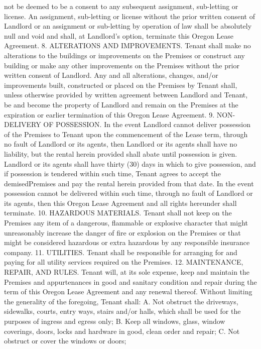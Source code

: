 not be deemed to be a consent to any subsequent assignment, sub-letting or license. An
assignment, sub-letting or license without the prior written consent of Landlord or an assignment
or sub-letting by operation of law shall be absolutely null and void and shall, at Landlord's option,
terminate this Oregon Lease Agreement.
8. ALTERATIONS AND IMPROVEMENTS. Tenant shall make no alterations to the buildings or
improvements on the Premises or construct any building or make any other improvements on the
Premises without the prior written consent of Landlord. Any and all alterations, changes, and/or
improvements built, constructed or placed on the Premises by Tenant shall, unless otherwise
provided by written agreement between Landlord and Tenant, be and become the property of
Landlord and remain on the Premises at the expiration or earlier termination of this Oregon Lease
Agreement.
9. NON-DELIVERY OF POSSESSION. In the event Landlord cannot deliver possession of the
Premises to Tenant upon the commencement of the Lease term, through no fault of Landlord or
its agents, then Landlord or its agents shall have no liability, but the rental herein provided shall
abate until possession is given. Landlord or its agents shall have thirty (30) days in which to give
possession, and if possession is tendered within such time, Tenant agrees to accept the demisedPremises and pay the rental herein provided from that date. In the event possession cannot be
delivered within such time, through no fault of Landlord or its agents, then this Oregon Lease
Agreement and all rights hereunder shall terminate.
10. HAZARDOUS MATERIALS. Tenant shall not keep on the Premises any item of a dangerous,
flammable or explosive character that might unreasonably increase the danger of fire or explosion
on the Premises or that might be considered hazardous or extra hazardous by any responsible
insurance company.
11. UTILITIES. Tenant shall be responsible for arranging for and paying for all utility services
required on the Premises.
12. MAINTENANCE, REPAIR, AND RULES. Tenant will, at its sole expense, keep and maintain the
Premises and appurtenances in good and sanitary condition and repair during the term of this
Oregon Lease Agreement and any renewal thereof. Without limiting the generality of the
foregoing, Tenant shall:
A. Not obstruct the driveways, sidewalks, courts, entry ways, stairs and/or halls, which shall be
used for the purposes of ingress and egress only;
B. Keep all windows, glass, window coverings, doors, locks and hardware in good, clean order
and repair;
C. Not obstruct or cover the windows or doors;
